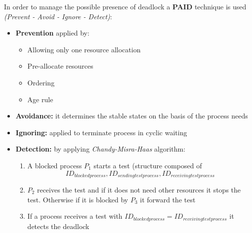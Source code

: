 In order to manage the possible presence of deadlock a \textbf{PAID} technique is used \textit{(Prevent - Avoid - Ignore - Detect)}:
\begin{itemize}
    \item \textbf{Prevention} applied by:
        \begin{itemize}
            \item Allowing only one resource allocation
            \item Pre-allocate resources
            \item Ordering
            \item Age rule
        \end{itemize}
    \item \textbf{Avoidance:} it determines the stable states on the basis of the process needs
    \item \textbf{Ignoring:} applied to terminate process in cyclic waiting
    \item \textbf{Detection:} by applying \textit{Chandy-Misra-Haas} algorithm:
        \begin{enumerate}
            \item A blocked process \(P_1\) starts a test (structure composed of \[ID_{blocked process}, ID_{sending test process}, ID_{receiving test process}\]
            \item \(P_2\) receives the test and if it does not need other resources it stops the test. Otherwise if it is blocked by \(P_3\) it forward the test
            \item If a process receives a test with \(ID_{blocked process} = ID_{receiving test process}\) it detects the deadlock
        \end{enumerate}
\end{itemize}